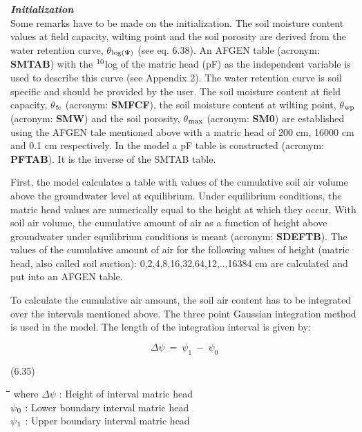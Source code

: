 \documentclass[11pt]{article}
\begin{document}
\bigskip
{\bf {\it Initialization\/}}\\
Some remarks have to be made on the initialization. The soil moisture content values at
field capacity, wilting point and the soil porosity are derived from the water retention
curve, $\theta$$_{{\rm log(}{\rm \Psi}{)}}$ (see eq. 6.38). An AFGEN table (acronym: {\bf SMTAB}) with the $^{{\rm 10}}$log of the
matric head (pF) as the independent variable is used to describe this curve (see Appendix
2). The water retention curve is soil specific and should be provided by the user. The soil
moisture content at field capacity, {\bf $\theta$$_{{\rm fc}}$} (acronym: {\bf SMFCF}), the soil moisture content at
wilting point, {\bf $\theta$$_{{\rm wp}}$} (acronym: {\bf SMW}) and the soil porosity, {\bf $\theta$$_{{\rm max}}$} (acronym: {\bf SM0}) are
established using the AFGEN tale mentioned above with a matric head of 200 cm, 16000
cm and 0.1 cm respectively. In the model a pF table is constructed (acronym: {\bf PFTAB}).
It is the inverse of the SMTAB table.

\bigskip
First, the model calculates a table with values of the cumulative soil air volume above the
ground\-water level at equilibrium. Under equilibrium conditions, the matric head values
are numerically equal to the height at which they occur. With soil air volume, the
cumulat\-ive amount of air as a function of height above groundwater under equilibrium
conditions is meant (acronym: {\bf SDEFTB}). The values of the cumulative amount of air for
the following values of height (matric head, also called soil suction): 0,2,4,8,16,32,64,12,..,16384 cm are calculated and put into an AFGEN table. 

\bigskip
\bigskip
To calculate the cumulative air amount, the soil air content has to be integrated over the
intervals mentioned above. The three point Gaussian integration method is used in the
model. The length of the integration interval is given by:

\begin{displaymath}
\Delta  \psi ~=~ \psi _{1} ~-~ \psi _{0} 
\end{displaymath}

 \bigskip
\strut\hfill (6.35)
\nwln
\begin{tabbing}
\hspace{1.27cm}\=\hspace{1.27cm}\=\hspace{1.27cm}\=\hspace{1.27cm}\=%
\hspace{1.27cm}\=\hspace{1.27cm}\=\hspace{1.27cm}\=\hspace{1.27cm}\=%
\hspace{1.27cm}\=\hspace{1.27cm}\=\kill
where\> $\Delta$$\psi$\> : Height of interval matric head\> \> \> \> \> \> \> \> [cm]\\
\>$\psi$$_{{\rm 0}}$\> : Lower boundary interval matric head\> \> \> \> \> \> \> \> [cm]\\
\>$\psi$$_{{\rm 1}}$\> : Upper boundary interval matric head\> \> \> \> \> \> \> \> [cm]
\end{tabbing}
\end{document}
